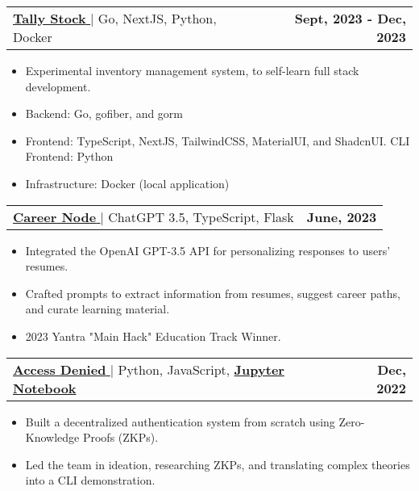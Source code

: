 \documentclass[letterpaper,11pt]{article}
\makeatletter
\newcommand{\uniformunderline}[1]{%
  \uline{\phantom{#1}}%
  \llap{\contour{white}{#1}}%
}
\newcommand{\resumeItem}[1]{
  \item\small{
    {#1 \vspace{-2pt}}
  }
}
\newcommand{\resumeProjectHeading}[2]{
    \item
    \begin{tabular*}{1.001\textwidth}{l@{\extracolsep{\fill}}r}
      \small#1 & \textbf{\small #2}\\
    \end{tabular*}\vspace{-7pt}
}
\newcommand{\resumeItemListStart}{\begin{itemize}}
\newcommand{\resumeItemListEnd}{\end{itemize}\vspace{-5pt}}
\makeatother
\begin{document}
        \resumeProjectHeading
          {\href{https://github.com/saharshbhansali/TallyStock}{\textbf{\large{Tally Stock}} \href{https://github.com/saharshbhansali/TallyStock}{\raisebox{-0.1\height}\faExternalLink }} $|$ \normalsize{Go, NextJS, Python, Docker}}{Sept, 2023 - Dec, 2023}
          \vspace{-11pt}
          \resumeItemListStart
            \resumeItem{\normalsize{Experimental inventory management system, to self-learn full stack development.}} 
            \resumeItem{\normalsize{Backend: Go, gofiber, and gorm}} 
            \resumeItem{\normalsize{Frontend: TypeScript, NextJS, TailwindCSS, MaterialUI, and ShadcnUI. CLI Frontend: Python}}
            \resumeItem{\normalsize{Infrastructure: Docker (local application)}}
          \resumeItemListEnd
          \vspace{-15pt}

        \resumeProjectHeading
          {\href{https://github.com/kaushalrathi24/funtimeError}{\textbf{\large{Career Node}} \href{https://github.com/kaushalrathi24/funtimeError}{\raisebox{-0.1\height}\faExternalLink }} $|$ \normalsize{ChatGPT 3.5, TypeScript, Flask}}{June, 2023}
          \vspace{-11pt}
          \resumeItemListStart
            \resumeItem{\normalsize{Integrated the OpenAI GPT-3.5 API for personalizing responses to users' resumes.}} 
            \resumeItem{\normalsize{Crafted prompts to extract information from resumes, suggest career paths, and curate learning material.}} 
            \resumeItem{\normalsize{2023 Yantra "Main Hack" Education Track Winner.}} \vspace{-0.1pt}
          \resumeItemListEnd 
          \vspace{-15pt}

      \resumeProjectHeading
          {\href{https://github.com/ACM-VIT/accessDenied}{\textbf{\large{Access Denied}} \href{https://github.com/ACM-VIT/accessDenied}{\raisebox{-0.1\height}\faExternalLink }} $|$ \normalsize{Python, JavaScript, \href{https://colab.research.google.com/drive/1oTl9P42TniMFApstGZ4R4WLa_jZR1WrS}{\textbf{Jupyter Notebook}}} {\raisebox{-0.1\height}\faExternalLink}}{Dec, 2022}
          \vspace{-11pt}
          \resumeItemListStart
            \resumeItem{\normalsize{Built a decentralized authentication system from scratch using Zero-Knowledge Proofs (ZKPs).}} 
            \resumeItem{\normalsize{Led the team in ideation, researching ZKPs, and translating complex theories into a CLI demonstration.}}
          \resumeItemListEnd
          \vspace{-15pt}
          
\end{document}
